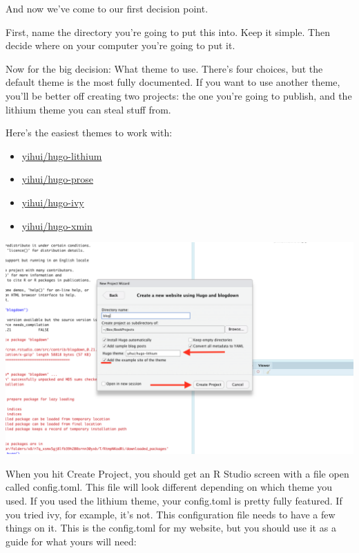 \documentclass[
]{book}
\providecommand{\tightlist}{%
  \setlength{\itemsep}{0pt}\setlength{\parskip}{0pt}}
\begin{document}
And now we've come to our first decision point.

First, name the directory you're going to put this into. Keep it simple. Then decide where on your computer you're going to put it.

Now for the big decision: What theme to use. There's four choices, but the default theme is the most fully documented. If you want to use another theme, you'll be better off creating two projects: the one you're going to publish, and the lithium theme you can steal stuff from.

Here's the easiest themes to work with:

\begin{itemize}
\tightlist
\item
  \href{https://github.com/yihui/hugo-lithium}{yihui/hugo-lithium}
\item
  \href{https://github.com/yihui/hugo-prose}{yihui/hugo-prose}
\item
  \href{https://github.com/yihui/hugo-ivy}{yihui/hugo-ivy}
\item
  \href{https://github.com/yihui/hugo-xmin}{yihui/hugo-xmin}
\end{itemize}

\includegraphics[width=16.58in]{images/blog3}

When you hit Create Project, you should get an R Studio screen with a file open called config.toml. This file will look different depending on which theme you used. If you used the lithium theme, your config.toml is pretty fully featured. If you tried ivy, for example, it's not. This configuration file needs to have a few things on it. This is the config.toml for my website, but you should use it as a guide for what yours will need:
\end{document}

